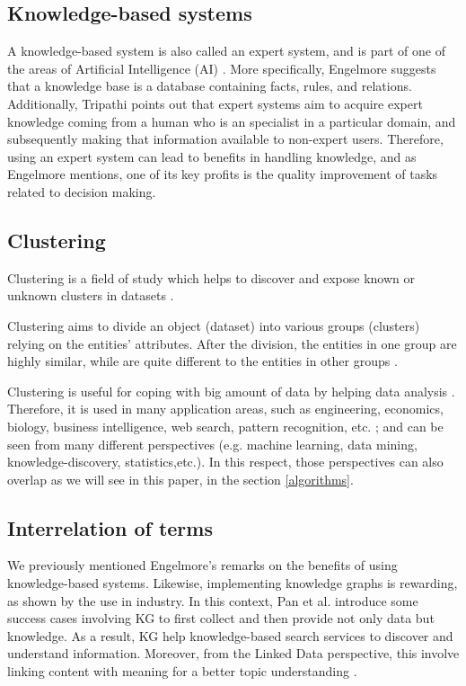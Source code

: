 \documentclass[runningheads]{llncs}
\begin{document}
\subsection{Knowledge-based systems} \label{knowledge-based}
A knowledge-based system is also called an expert system, and is part of one of the areas of Artificial Intelligence (AI) \cite{Tripathi}. More specifically, Engelmore \cite{Engelmore} suggests that a knowledge base is a database containing facts, rules, and relations. Additionally, Tripathi \cite{Tripathi} points out that expert systems aim to acquire expert knowledge coming from a human who is an specialist in a particular domain, and subsequently making that information available to non-expert users.
Therefore, using an expert system can lead to benefits in handling knowledge, and as Engelmore \cite{Engelmore} mentions, one of its key profits is the quality improvement of tasks related to decision making.


\subsection{Clustering} \label{clustering}
Clustering is a field of study which helps to discover and expose known or unknown clusters in datasets \cite{Han} \cite{Mirkin}.

Clustering aims to divide an object (dataset) into various groups (clusters) relying on the entities' attributes. After the division, the entities in one group are highly similar, while are quite different to the entities in other groups \cite{Han}.

Clustering is useful for coping with big amount of data by helping data analysis \cite{Pedrycz} \cite{Mirkin}. Therefore, it is used in many application areas, such as engineering, economics, biology, business intelligence, web search, pattern recognition, etc. \cite{Pedrycz} \cite{Han}; and can be seen from many different perspectives (e.g. machine learning, data mining, knowledge-discovery, statistics,etc.). In this respect, those perspectives can also overlap as we will see in this paper, in the section \ref{algorithms}.


\subsection{Interrelation of terms} \label{interrelation}
We previously mentioned Engelmore's remarks on the benefits of using knowledge-based systems. Likewise, implementing knowledge graphs is rewarding, as shown by the use in industry. In this context, Pan et al. \cite{Pan} introduce some success cases involving KG to first collect and then provide not only data but knowledge. As a result, KG help knowledge-based search services to discover and understand information.
Moreover, from the Linked Data perspective, this involve linking content with meaning for a better topic understanding \cite{Pan}.
\end{document}
